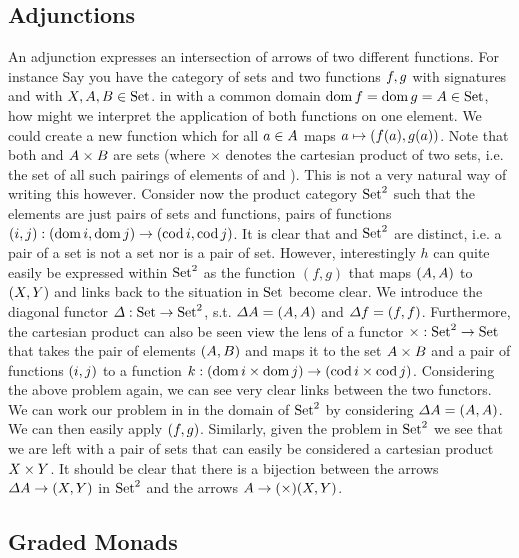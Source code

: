 \subsection{Adjunctions}
An adjunction expresses an intersection of arrows of two different functions. For instance Say you have the category  of sets \cite{RelationalAlgebraByWayOfAdjunctions} and two functions $\mathnormal{f}, \mathnormal{g}$ with signatures  and  with $\mathnormal{X}, \mathnormal{A}, \mathnormal{B} \in \mathrm{Set}$.
in  with a common domain $\mathrm{dom}\,\mathnormal{f} = \mathrm{dom}\,\mathnormal{g} = \mathnormal{A} \in \mathrm{Set}$, how might we interpret the application of both functions on one element. We could create a new function  which for all $a \in \mathnormal{A}$ maps $a \mapsto (\mathnormal{f}(a), \mathnormal{g}(a))$. Note that both  and $\mathnormal{A} \times \mathnormal{B}$ are sets (where $\times$ denotes the cartesian product of two sets, i.e. the set of all such pairings of elements of  and ). This is not a very natural way of writing this however. Consider now the product category $\mathrm{Set}^2$ such that the elements are just pairs of sets and functions, pairs of functions $(\mathnormal{i}, \mathnormal{j}): (\mathrm{dom}\,\mathnormal{i}, \mathrm{dom}\,\mathnormal{j}) \to (\mathrm{cod}\,\mathnormal{i}, \mathrm{cod}\,\mathnormal{j})$. It is clear that  and $\mathrm{Set}^2$ are distinct, i.e. a pair of a set is not a set nor is a pair of set. However, interestingly $h$ can quite easily be expressed within $\mathrm{Set}^2$ as the function $(f, g)$ that maps $(\mathnormal{A}, \mathnormal{A})$ to $(\mathnormal{X}, \mathnormal{Y})$ and links back to the situation in $\mathrm{Set}$ become clear. We introduce the diagonal functor $\mathnormal{\Delta}: \mathrm{Set} \to \mathrm{Set}^2$, s.t. $\mathnormal{\Delta} \mathnormal{A} = (\mathnormal{A}, \mathnormal{A})$ and $\mathnormal{\Delta} \mathnormal{f} = (\mathnormal{f}, \mathnormal{f})$. Furthermore, the cartesian product can also be seen view the lens of a functor $\mathnormal{\times}: \mathrm{Set}^2 \to \mathrm{Set}$ that takes the pair of elements $(\mathnormal{A}, \mathnormal{B})$ and maps it to the set $\mathnormal{A} \times \mathnormal{B}$ and a pair of functions $(\mathnormal{i}, \mathnormal{j})$ to a function $k: \left(\mathrm{dom}\,\mathnormal{i} \times \mathrm{dom}\,\mathnormal{j}\right) \to \left(\mathrm{cod}\,\mathnormal{i} \times \mathrm{cod}\,\mathnormal{j}\right)$.
Considering the above problem again, we can see very clear links between the two functors. We can work our problem in  in the domain of $\mathrm{Set}^2$ by considering $\mathnormal{\Delta} \mathnormal{A} = (\mathnormal{A}, \mathnormal{A})$. We can then easily apply $(\mathnormal{f}, \mathnormal{g})$. Similarly, given the problem in $\mathrm{Set}^2$ we see that we are left with a pair of sets that can easily be considered a cartesian product $\mathnormal{X} \times \mathnormal{Y}$. It should be clear that there is a bijection between the arrows $\mathnormal{\Delta} \mathnormal{A} \to (\mathnormal{X}, \mathnormal{Y})$ in $\mathrm{Set}^2$ and the arrows $\mathnormal{A} \to \mathnormal{(\times)} \mathnormal{(X, Y)}$.

\subsection{Graded Monads}\label{sec:gradedmonads}